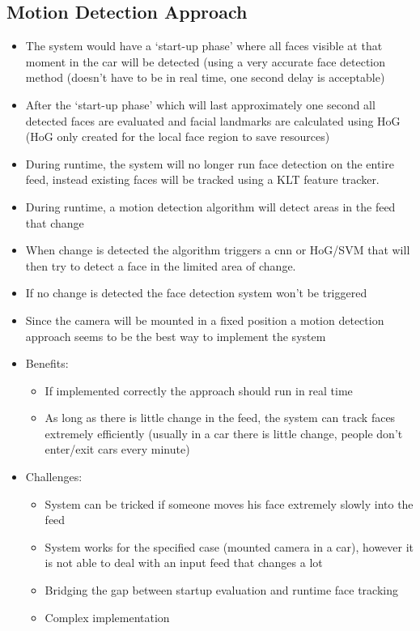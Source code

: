 \subsection{Motion Detection Approach}
\begin{itemize}
    \item The system would have a ‘start-up phase’ where all faces visible at that moment in the car will be detected (using a very accurate face detection method (doesn’t have to be in real time, one second delay is acceptable)
    \item After the ‘start-up phase’ which will last approximately one second all detected faces are evaluated and facial landmarks are calculated using HoG (HoG only created for the local face region to save resources)
    \item During runtime, the system will no longer run face detection on the entire feed, instead existing faces will be tracked using a KLT feature tracker.
    \item During runtime, a motion detection algorithm will detect areas in the feed that change
    \item When change is detected the algorithm triggers a \gls{cnn} or HoG/SVM that will then try to detect a face in the limited area of change.
    \item If no change is detected the face detection system won’t be triggered
    \item Since the camera will be mounted in a fixed position a motion detection approach seems to be the best way to implement the system
    \item Benefits:
        \begin{itemize}
        \item If implemented correctly the approach should run in real time
        \item As long as there is little change in the feed, the system can track faces extremely efficiently (usually in a car there is little change, people don’t enter/exit cars every minute)
        \end{itemize}
    \item Challenges:
            \begin{itemize}
        \item System can be tricked if someone moves his face extremely slowly into the feed
        \item System works for the specified case (mounted camera in a car), however it is not able to deal with an input feed that changes a lot
        \item Bridging the gap between startup evaluation and runtime face tracking
        \item Complex implementation
                \end{itemize}
\end{itemize}
